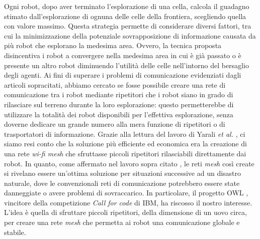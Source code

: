 Ogni robot, dopo aver terminato l'esplorazione di una cella, calcola il guadagno stimato dall'esplorazione di ognuna delle celle della frontiera, scegliendo quella con valore massimo.
Questa strategia permette di considerare diversi fattori, tra cui la minimizzazione della potenziale sovrapposizione di informazione causata da più robot che esplorano la medesima area.
Ovvero, la tecnica proposta disincentiva i robot a convergere nella medesima area in cui è già passato o è presente un altro robot diminuendo l'utilità delle celle nell'intorno del bersaglio degli agenti.
Ai fini di superare i problemi di comunicazione evidenziati dagli articoli sopracitati, abbiamo cercato se fosse possibile creare una rete di comunicazione tra i robot mediante ripetitori che i robot siano in grado di rilasciare sul terreno durante la loro esplorazione: questo permetterebbe di utilizzare la totalità dei robot disponibili per l'effettiva esplorazione, senza doverne dedicare un grande numero alla mera funzione di ripetitori o di trasportatori di informazione. 
Grazie alla lettura del lavoro di Yarali \textit{et al.} \cite{yarali2009wireless}, ci siamo resi conto che la soluzione più efficiente ed economica era la creazione di una rete \textit{wi-fi mesh} che sfruttasse piccoli ripetitori rilasciabili direttamente dai robot.
In quanto, come affermato nel lavoro sopra citato \cite{yarali2009wireless}, le reti \textit{mesh} così create si rivelano essere un'ottima soluzione per situazioni successive ad un disastro naturale, dove le convenzionali reti di comunicazione potrebbero essere state danneggiate o avere problemi di sovraccarico.
In particolare, il progetto OWL \cite{OWL}, vincitore della competizione \textit{Call for code} di IBM, ha riscosso il nostro interesse. 
L'idea è quella di sfruttare piccoli ripetitori, della dimensione di un uovo circa, per creare una rete \textit{mesh} che permetta ai robot una comunicazione globale e stabile.
